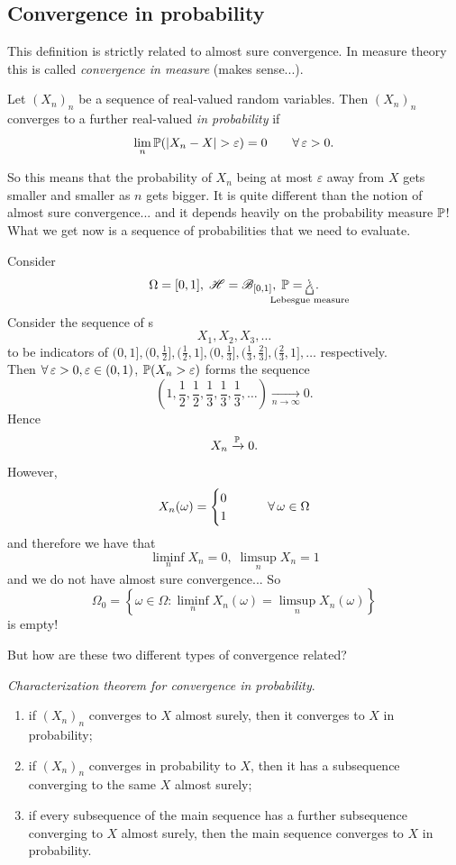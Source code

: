 \documentclass{report}
\begin{document}
\subsection{Convergence in probability}
This definition is strictly related to almost sure convergence. In measure theory this is called \textit{convergence in measure} (makes sense...).
\begin{definition}
	Let ${(X_n)}_{n}$ be a sequence of real-valued random variables. Then ${(X_n)}_{n}$ converges to a further real-valued \rv{} \emph{in probability} if 
	\[\lim_n\pr(|X_n-X|>\varepsilon)=0\qquad\every\varepsilon>0.\]
\end{definition}
So this means that the probability of $X_n$ being at most $\varepsilon$ away from $X$ gets smaller and smaller as $n$ gets bigger. It is quite different than the notion of almost sure convergence... and it depends heavily on the probability measure $\mathbb{P}$!
What we get now is a sequence of probabilities that we need to evaluate. 
\begin{example}
	Consider
	\[\Omega=[0,1],\;\HS=\B_{[0,1]},\;\pr=\underbracket[0.6pt]{\leb}_{\mathclap{\text{Lebesgue measure}}}.\]
	Consider the sequence of \rv s
	\[X_1,X_2,X_3,\ldots\]
	to be indicators of $(0,1],(0,\frac{1}{2}],(\frac{1}{2},1],(0,\frac{1}{3}],(\frac{1}{3},\frac{2}{3}],(\frac{2}{3},1],\ldots$ respectively.\\
	Then $\forall\,\varepsilon>0,\varepsilon\in(0,1)$, $\mathbb{P}(X_n>\varepsilon)$ forms the sequence
	\[(1,\frac{1}{2},\frac{1}{2},\frac{1}{3},\frac{1}{3},\frac{1}{3},\ldots)\xrightarrow[n\to\infty]{}0.\]
	Hence 
	\[X_n\xrightarrow[]{\mathbb{P}}0.\]
	However,
	\[X_n(\omega)=\begin{cases}
		0\\		1
	\end{cases}\qquad\forall\,\omega\in\Omega\]
	and therefore we have that 
	\[\liminf_n X_n=0,\;\limsup_n X_n=1\]
	and we do not have almost sure convergence... So \[\Omega_0=\left\{\omega\in\Omega:\liminf_n X_n(\omega)=\limsup_n X_n(\omega)\right\}\] is empty!
\end{example}
But how are these two different types of convergence related?
\begin{theorem}
	\emph{Characterization theorem for convergence in probability}. 
	\begin{enumerate}[label=\textit{\roman*})]
		\item \label{ehehe} if ${(X_n)}_{n}$ converges to $X$ almost surely, then it converges to $X$ in probability;
		\item \label{ehehe2} if ${(X_n)}_{n}$ converges in probability to $X$, then it has a subsequence converging to the same \rv{} $X$ almost surely;
		\item \label{ehehe3} if every subsequence of the main sequence has a further subsequence converging to $X$ almost surely, then the main sequence converges to $X$ in probability.
	\end{enumerate}
\end{theorem}
\end{document}
